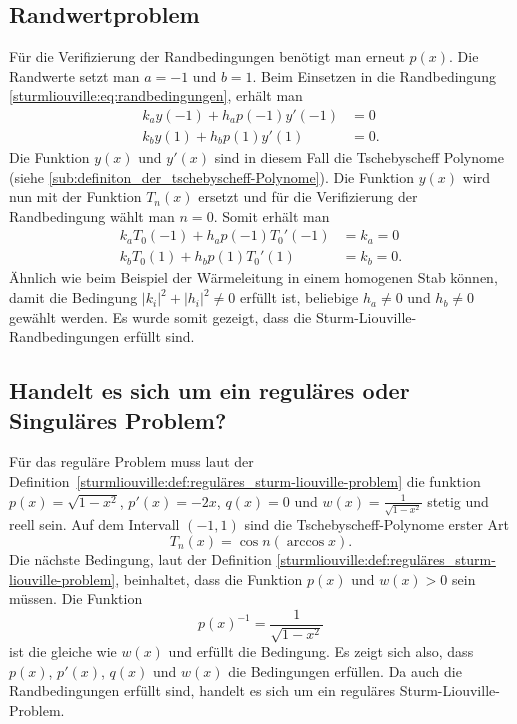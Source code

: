 \subsection*{Randwertproblem}
Für die Verifizierung der Randbedingungen benötigt man erneut $p(x)$.
Die Randwerte setzt man $a = -1$ und $b = 1$.
Beim Einsetzen in die Randbedingung \eqref{sturmliouville:eq:randbedingungen},
erhält man
\begin{equation}
	\begin{aligned}
		k_a y(-1) + h_a p(-1) y'(-1) &= 0\\
		k_b y(1) + h_b p(1) y'(1) &= 0.
	\end{aligned} 
\end{equation}
Die Funktion $y(x)$ und $y'(x)$ sind in diesem Fall die Tschebyscheff Polynome
(siehe \ref{sub:definiton_der_tschebyscheff-Polynome}).
Die Funktion $y(x)$ wird nun mit der Funktion $T_n(x)$ ersetzt und für die
Verifizierung der Randbedingung wählt man $n=0$.
Somit erhält man
\begin{equation}
	\begin{aligned}
		k_a T_0(-1) + h_a p(-1) T_{0}'(-1) &= k_a = 0\\
		k_b T_0(1) + h_b p(1) T_{0}'(1) &= k_b = 0.
	\end{aligned}
\end{equation}
Ähnlich wie beim Beispiel der Wärmeleitung in einem homogenen Stab können,
damit die Bedingung $|k_i|^2 + |h_i|^2\ne 0$ erfüllt ist, beliebige
$h_a \ne 0$ und $h_b \ne 0$ gewählt werden.
Es wurde somit gezeigt, dass die Sturm-Liouville-Randbedingungen erfüllt sind.

\subsection*{Handelt es sich um ein reguläres oder Singuläres Problem?}
Für das reguläre Problem muss laut der
Definition~\ref{sturmliouville:def:reguläres_sturm-liouville-problem} die funktion
$p(x) = \sqrt{1-x^2}$, $p'(x) = -2x$, $q(x) = 0$ und
$w(x) = \frac{1}{\sqrt{1-x^2}}$ stetig und reell sein.
Auf dem Intervall $(-1,1)$ sind die Tschebyscheff-Polynome erster Art
\begin{equation}
	T_n(x)
	=
	\cos n (\arccos x).
\end{equation}
Die nächste Bedingung, laut der Definition \ref{sturmliouville:def:reguläres_sturm-liouville-problem}, beinhaltet, dass die Funktion $p(x)$ und $w(x)>0$ sein
müssen.
Die Funktion
\begin{equation*}
	p(x)^{-1} = \frac{1}{\sqrt{1-x^2}}
\end{equation*}
ist die gleiche wie $w(x)$ und erfüllt die Bedingung.
Es zeigt sich also, dass $p(x)$, $p'(x)$, $q(x)$ und $w(x)$
die Bedingungen erfüllen.
Da auch die Randbedingungen erfüllt sind, handelt es sich um ein reguläres Sturm-Liouville-Problem.


